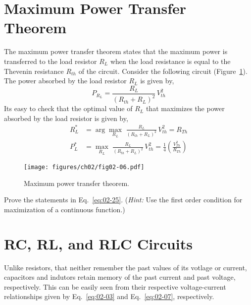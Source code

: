 \section{Maximum Power Transfer Theorem}
The maximum power transfer theorem states that the maximum power is transferred to the load resistor $R_L$ when the load resistance is equal to the Thevenin resistance $R_{th}$ of the circuit. Consider the following circuit (Figure~\ref{fig:02-06}). The power absorbed by the load resistor $R_L$ is given by,
\begin{equation}
    P_{R_L} = \frac{R_L}{(R_{th} + R_L)^2} \, V_{th}^2
    \label{eq:02-24}
\end{equation}
Its easy to check that the optimal value of $R_L$ that maximizes the power absorbed by the load resistor is given by,
\begin{equation}
    \begin{split}
        R_L^* &= \arg\max_{R_L} \,\, \frac{R_L}{(R_{th} + R_L)^2} \, V_{th}^2 = R_{Th} \\
        P_L^* &= \max_{R_L} \,\, \frac{R_L}{(R_{th} + R_L)^2} \, V_{th}^2 = \frac{1}{4}\left(\frac{V_{Th}^2}{R_{Th}}\right)
    \end{split}
    \label{eq:02-25}
\end{equation}

\begin{figure}[t]
    \centering
    \texttt{[image: figures/ch02/fig02-06.pdf]}
    \caption{Maximum power transfer theorem.}
    \label{fig:02-06}
\end{figure}

\begin{boxedstuff}
    \begin{problem}
        Prove the statements in Eq.~\ref{eq:02-25}. (\textit{Hint:} Use the first order condition for maximization of a continuous function.)
    \end{problem}
\end{boxedstuff}

\section{RC, RL, and RLC Circuits}
Unlike resistors, that neither remember the past values of its votlage or current, capacitors and indutors retain memory of the past current and past voltage, respectively. This can be easily seen from their respective voltage-current relationships given by Eq.~\ref{eq:02-03} and Eq.~\ref{eq:02-07}, respectively. 

